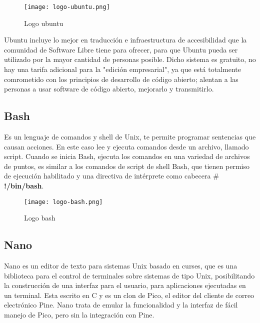 \documentclass[ spanish, a4paper, 12pt, oneside]{report}
\begin{document}
\begin{figure}[!h]
   \centering
   \texttt{[image: logo-ubuntu.png]}\\
      \caption{\label{fig: Logo ubuntu} Logo ubuntu}
\end{figure}

Ubuntu incluye lo mejor en traducción e infraestructura de accesibilidad que la comunidad de Software Libre tiene para ofrecer, para que Ubuntu pueda ser utilizado por la mayor cantidad de personas posible. Dicho sistema es gratuito, no hay una tarifa adicional 
para la "edición empresarial", ya que está totalmente comrometido con los principios de desarrollo de código abierto; alentan a las personas a usar software de código abierto, mejorarlo y transmitirlo. \\

\subsection{Bash}

Es un lenguaje de comandos y shell de Unix, te permite programar sentencias que causan acciones. En este caso lee y ejecuta comandos desde un archivo, llamado script. Cuando se inicia Bash, ejecuta los comandos en una variedad de archivos de puntos, es similar a los 
comandos de script de shell Bash, que tienen permiso de ejecución habilitado y una directiva de intérprete como cabecera \textbf{$\#$!/bin/bash}. \\

\begin{figure}[!h]
   \centering
   \texttt{[image: logo-bash.png]}\\
      \caption{\label{fig: Logo bash} Logo bash}
\end{figure}

\subsection{Nano}
Nano es un editor de texto para sistemas Unix basado en curses, que es una biblioteca para el control de terminales sobre sistemas de tipo Unix, posibilitando la construcción de una interfaz para el usuario, para aplicaciones ejecutadas en un terminal. Esta escrito en C y es un clon de Pico, 
el editor del cliente de correo electrónico Pine. Nano trata de emular la funcionalidad y la interfaz de fácil manejo de Pico, pero sin la integración con Pine. \\
\end{document}
